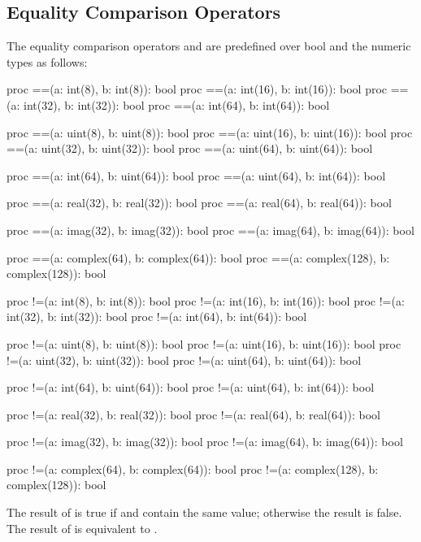 \subsection{Equality Comparison Operators}
\label{Equality_Comparison_Operators}

The equality comparison operators \chpl{==} and \chpl{\!=} are predefined over bool and the
numeric types as follows:
\begin{chapel}
proc ==(a: int(8), b: int(8)): bool
proc ==(a: int(16), b: int(16)): bool
proc ==(a: int(32), b: int(32)): bool
proc ==(a: int(64), b: int(64)): bool

proc ==(a: uint(8), b: uint(8)): bool
proc ==(a: uint(16), b: uint(16)): bool
proc ==(a: uint(32), b: uint(32)): bool
proc ==(a: uint(64), b: uint(64)): bool

proc ==(a: int(64), b: uint(64)): bool
proc ==(a: uint(64), b: int(64)): bool

proc ==(a: real(32), b: real(32)): bool
proc ==(a: real(64), b: real(64)): bool

proc ==(a: imag(32), b: imag(32)): bool
proc ==(a: imag(64), b: imag(64)): bool

proc ==(a: complex(64), b: complex(64)): bool
proc ==(a: complex(128), b: complex(128)): bool

proc !=(a: int(8), b: int(8)): bool
proc !=(a: int(16), b: int(16)): bool
proc !=(a: int(32), b: int(32)): bool
proc !=(a: int(64), b: int(64)): bool

proc !=(a: uint(8), b: uint(8)): bool
proc !=(a: uint(16), b: uint(16)): bool
proc !=(a: uint(32), b: uint(32)): bool
proc !=(a: uint(64), b: uint(64)): bool

proc !=(a: int(64), b: uint(64)): bool
proc !=(a: uint(64), b: int(64)): bool

proc !=(a: real(32), b: real(32)): bool
proc !=(a: real(64), b: real(64)): bool

proc !=(a: imag(32), b: imag(32)): bool
proc !=(a: imag(64), b: imag(64)): bool

proc !=(a: complex(64), b: complex(64)): bool
proc !=(a: complex(128), b: complex(128)): bool
\end{chapel}
The result of  is true if  and  contain
the same value; otherwise the result is false.  The result of  is equivalent to .

